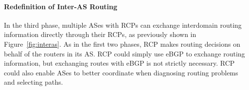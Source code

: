 

\paragraph{Redefinition of Inter-AS Routing}\label{sec:interas}

In the third
phase, multiple ASes with RCPs can exchange interdomain routing
information directly through their RCPs, as previously shown in
Figure~\ref{fig:interas}. As in the first
two phases, RCP makes routing decisions on behalf of the
routers in its AS.  
RCP could simply use eBGP to exchange routing
information, but exchanging routes with eBGP is not strictly necessary.
RCP could also enable ASes to better coordinate when 
diagnosing routing problems and selecting paths.

